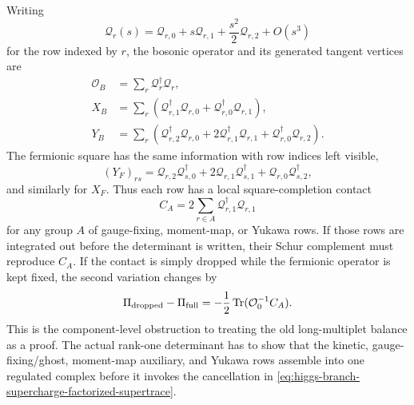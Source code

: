 \begin{example}
Writing
\[
  {\mathcal Q}_r(s)
  =
  {\mathcal Q}_{r,0}
  +
  s{\mathcal Q}_{r,1}
  +
  \frac{s^2}{2}{\mathcal Q}_{r,2}
  +
  O(s^3)
\]
for the row indexed by \(r\), the bosonic operator and its generated tangent
vertices are
\begin{equation}
\begin{aligned}
  {\mathcal O}_B
  &=
  \sum_r{\mathcal Q}_r^\dagger{\mathcal Q}_r,\\
  X_B
  &=
  \sum_r
  \left(
    {\mathcal Q}_{r,1}^\dagger{\mathcal Q}_{r,0}
    +
    {\mathcal Q}_{r,0}^\dagger{\mathcal Q}_{r,1}
  \right),\\
  Y_B
  &=
  \sum_r
  \left(
    {\mathcal Q}_{r,2}^\dagger{\mathcal Q}_{r,0}
    +
    2{\mathcal Q}_{r,1}^\dagger{\mathcal Q}_{r,1}
    +
    {\mathcal Q}_{r,0}^\dagger{\mathcal Q}_{r,2}
  \right).
  \label{eq:higgs-branch-row-completed-bosonic-vertices}
\end{aligned}
\end{equation}
The fermionic square has the same information with row indices left visible,
\begin{equation}
  (Y_F)_{rs}
  =
  {\mathcal Q}_{r,2}{\mathcal Q}_{s,0}^\dagger
  +
  2{\mathcal Q}_{r,1}{\mathcal Q}_{s,1}^\dagger
  +
  {\mathcal Q}_{r,0}{\mathcal Q}_{s,2}^\dagger ,
  \label{eq:higgs-branch-row-completed-fermionic-seagull}
\end{equation}
and similarly for \(X_F\).  Thus each row has a local square-completion contact
\[
  C_A
  =
  2\sum_{r\in A}{\mathcal Q}_{r,1}^\dagger{\mathcal Q}_{r,1}
\]
for any group \(A\) of gauge-fixing, moment-map, or Yukawa rows.  If those rows
are integrated out before the determinant is written, their Schur complement
must reproduce \(C_A\).  If the contact is simply dropped while the fermionic
operator is kept fixed, the second variation changes by
\begin{equation}
  \Pi_{\rm dropped}-\Pi_{\rm full}
  =
  -\frac12\,{\rm Tr}({\mathcal O}_0^{-1}C_A).
  \label{eq:higgs-branch-row-contact-residual}
\end{equation}
This is the component-level obstruction to treating the old long-multiplet
balance as a proof.  The actual rank-one determinant has to show that the
kinetic, gauge-fixing/ghost, moment-map auxiliary, and Yukawa rows assemble into
one regulated complex before it invokes the cancellation in
\eqref{eq:higgs-branch-supercharge-factorized-supertrace}.
\end{example}


